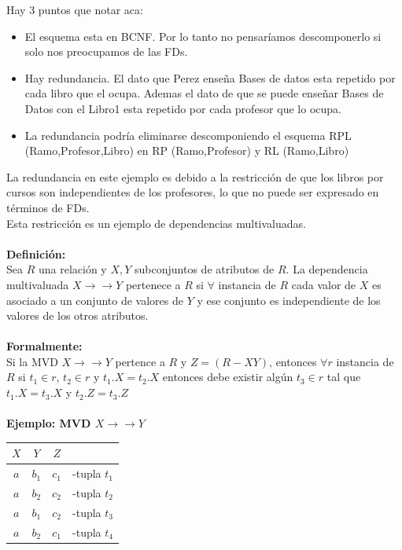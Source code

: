 \documentclass[11pt,letterpaper]{article}
\begin{document}
Hay 3 puntos que notar aca:
\begin{itemize}
	\item El esquema esta en BCNF. Por lo tanto no pensaríamos descomponerlo si solo nos preocupamos de las FDs.
	\item Hay redundancia. El dato que Perez enseña Bases de datos esta repetido por cada libro que el ocupa. Ademas el dato de que se puede enseñar Bases de Datos con el Libro1 esta repetido por cada profesor que lo ocupa.
	\item La redundancia podría eliminarse descomponiendo el esquema RPL (Ramo,Profesor,Libro) en RP (Ramo,Profesor) y RL (Ramo,Libro)
\end{itemize}
La redundancia en este ejemplo es debido a la restricción de que los libros por cursos son independientes de los profesores, lo que no puede ser expresado en términos de FDs. \\
Esta restricción es un ejemplo de dependencias multivaluadas.\\ \\
\textbf{Definición:} \\
Sea $R$ una relación y $X,Y$ subconjuntos de atributos de $R$. La dependencia multivaluada $X \rightarrow \rightarrow Y$ pertenece a $R$ si $\forall$ instancia de $R$ cada valor de $X$ es asociado a un conjunto de valores de $Y$ y ese conjunto es independiente de los valores de los otros atributos. \\ \\
\textbf{Formalmente:} \\
Si la MVD $X \rightarrow \rightarrow Y$ pertence a $R$ y $Z = (R-XY)$, entonces $\forall r$ instancia de $R$ si $t_1 \in r$, $t_2 \in r$ y $t_1.X = t_2.X$ entonces debe existir algún $t_3 \in r$ tal que $t_1.X = t_3.X$ y $t_2.Z = t_3.Z$ \\ \\

\textbf{Ejemplo: MVD $X \rightarrow \rightarrow Y$}
\begin{table}[h!]
	\center
	\begin{tabular}{|c|c|c|c|}
	\hline
	 $X$ &  $Y$ &  $Z$ &  \\ \hline\hline
	 $a$ & $b_1$ & $c_1$ & -tupla $t_1$ \\ \hline
	 $a$ & $b_2$ & $c_2$ & -tupla $t_2$ \\ \hline\hline
	 $a$ & $b_1$ & $c_2$ & -tupla $t_3$ \\ \hline
	 $a$ & $b_2$ & $c_1$ & -tupla $t_4$ \\ \hline
	\end{tabular}
\end{table}
\end{document}
